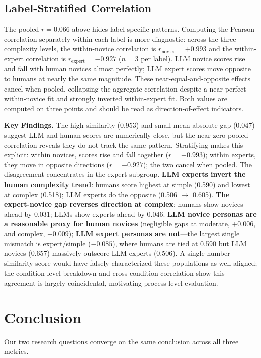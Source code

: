 \documentclass[manuscript,review]{acmart}
\begin{document}
\subsection{Label-Stratified Correlation}
The pooled $r = 0.066$ above hides label-specific patterns. Computing the Pearson correlation separately within each label is more diagnostic: across the three complexity levels, the within-novice correlation is $r_{\text{novice}} = +0.993$ and the within-expert correlation is $r_{\text{expert}} = -0.927$ ($n=3$ per label). LLM novice scores rise and fall with human novices almost perfectly; LLM expert scores move opposite to humans at nearly the same magnitude. These near-equal-and-opposite effects cancel when pooled, collapsing the aggregate correlation despite a near-perfect within-novice fit and strongly inverted within-expert fit. Both values are computed on three points and should be read as direction-of-effect indicators.

\textbf{Key Findings.} The high similarity (0.953) and small mean absolute gap (0.047) suggest LLM and human scores are numerically close, but the near-zero pooled correlation reveals they do not track the same pattern. Stratifying makes this explicit: within novices, scores rise and fall together ($r=+0.993$); within experts, they move in opposite directions ($r=-0.927$); the two cancel when pooled. The disagreement concentrates in the expert subgroup. \textbf{LLM experts invert the human complexity trend}: humans score highest at simple (0.590) and lowest at complex (0.518); LLM experts do the opposite (0.506 $\rightarrow$ 0.605). \textbf{The expert-novice gap reverses direction at complex}: humans show novices ahead by 0.031; LLMs show experts ahead by 0.046. \textbf{LLM novice personas are a reasonable proxy for human novices} (negligible gaps at moderate, $+0.006$, and complex, $+0.009$); \textbf{LLM expert personas are not}---the largest single mismatch is expert/simple ($-0.085$), where humans are tied at 0.590 but LLM novices (0.657) massively outscore LLM experts (0.506). A single-number similarity score would have falsely characterized these populations as well aligned; the condition-level breakdown and cross-condition correlation show this agreement is largely coincidental, motivating process-level evaluation.

\section{Conclusion}
Our two research questions converge on the same conclusion across all three metrics.
\end{document}

